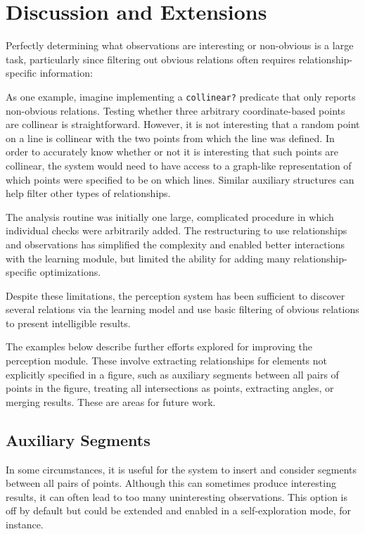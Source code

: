 \section{Discussion and Extensions}

Perfectly determining what observations are interesting or non-obvious
is a large task, particularly since filtering out obvious relations
often requires relationship-specific information:

As one example, imagine implementing a \texttt{collinear?}  predicate
that only reports non-obvious relations. Testing whether three
arbitrary coordinate-based points are collinear is
straightforward. However, it is not interesting that a random point on
a line is collinear with the two points from which the line was
defined. In order to accurately know whether or not it is interesting
that such points are collinear, the system would need to have access
to a graph-like representation of which points were specified to be on
which lines. Similar auxiliary structures can help filter other types
of relationships.

The analysis routine was initially one large, complicated procedure in
which individual checks were arbitrarily added. The restructuring to
use relationships and observations has simplified the complexity and
enabled better interactions with the learning module, but limited the
ability for adding many relationship-specific optimizations.

Despite these limitations, the perception system has been sufficient
to discover several relations via the learning model and use basic
filtering of obvious relations to present intelligible results.

The examples below describe further efforts explored for improving the
perception module. These involve extracting relationships for elements
not explicitly specified in a figure, such as auxiliary segments
between all pairs of points in the figure, treating all intersections
as points, extracting angles, or merging results. These are areas for
future work.

\subsection{Auxiliary Segments}

In some circumstances, it is useful for the system to insert and
consider segments between all pairs of points. Although this can
sometimes produce interesting results, it can often lead to too many
uninteresting observations. This option is off by default but could be
extended and enabled in a self-exploration mode, for instance.

